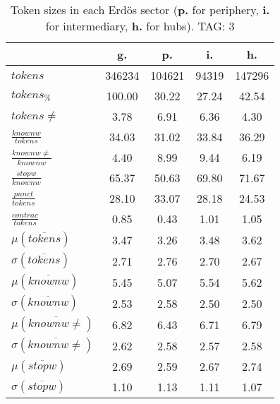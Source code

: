 \begin{table}[h!]
\begin{center}
\begin{tabular}{| l || c | c | c | c |}\hline
 & {\bf g.} & {\bf p.} & {\bf i.} & {\bf h.} \\\hline\hline
$tokens$ & 346234  & 104621  & 94319  & 147296 \\
$tokens_{\%}$ & 100.00  & 30.22  & 27.24  & 42.54 \\
$tokens \neq$ & 3.78  & 6.91  & 6.36  & 4.30 \\\hline
$\frac{knownw}{tokens}$ & 34.03  & 31.02  & 33.84  & 36.29 \\
$\frac{knownw \neq}{knownw}$ & 4.40  & 8.99  & 9.44  & 6.19 \\\hline
$\frac{stopw}{knownw}$ & 65.37  & 50.63  & 69.80  & 71.67 \\
$\frac{punct}{tokens}$ & 28.10  & 33.07  & 28.18  & 24.53 \\
$\frac{contrac}{tokens}$ & 0.85  & 0.43  & 1.01  & 1.05 \\\hline\hline
$\mu(\overline{tokens})$ & 3.47  & 3.26  & 3.48  & 3.62 \\
$\sigma(\overline{tokens})$ & 2.71  & 2.76  & 2.70  & 2.67 \\\hline
$\mu(\overline{knownw})$ & 5.45  & 5.07  & 5.54  & 5.62 \\
$\sigma(\overline{knownw})$ & 2.53  & 2.58  & 2.50  & 2.50 \\\hline
$\mu(\overline{knownw \neq})$ & 6.82  & 6.43  & 6.71  & 6.79 \\
$\sigma(\overline{knownw \neq})$ & 2.62  & 2.58  & 2.57  & 2.58 \\\hline
$\mu(\overline{stopw})$ & 2.69  & 2.59  & 2.67  & 2.74 \\
$\sigma(\overline{stopw})$ & 1.10  & 1.13  & 1.11  & 1.07 \\\hline
\end{tabular}
\caption{Token sizes in each Erd\"os sector ({{\bf p.}} for periphery, {{\bf i.}} for intermediary, {{\bf h.}} for hubs). TAG: 3}
\end{center}
\end{table}